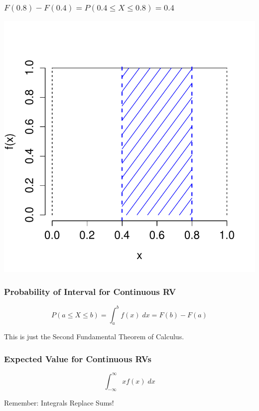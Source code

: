 \documentclass[handout]{beamer}
\begin{document}
\begin{frame}
\frametitle{$F(0.8) - F(0.4) = P(0.4 \leq X \leq 0.8) = 0.4$}
\centering
	\includegraphics[scale = 0.6]{./images/uniform_density_interval}


\end{frame}
\begin{frame}
\frametitle{Probability of Interval for Continuous RV}

$$\boxed{P(a\leq X \leq b) = \int_a^b f(x) \; dx = F(b) - F(a)}$$

\vspace{2em}
\alert{This is just the Second Fundamental Theorem of Calculus.}
\end{frame}

\begin{frame}
\frametitle{Expected Value for Continuous RVs}
$$\boxed{\int_{-\infty}^\infty x f(x) \; dx  }$$

\vspace{2em}
\alert{Remember: Integrals Replace Sums!}
\end{frame}
\end{document}
